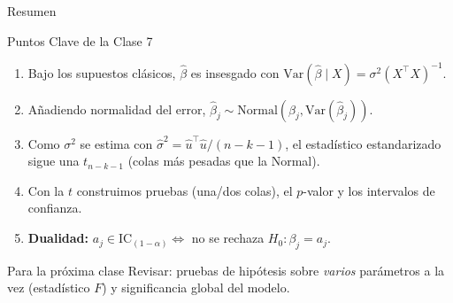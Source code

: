 \documentclass{beamer}
\begin{document}
\begin{frame}{Resumen}

\begin{block}{Puntos Clave de la Clase 7}
\begin{enumerate}
    \item Bajo los supuestos clásicos, $\hat{\beta}$ es insesgado con $\text{Var}(\hat{\beta}\mid X)=\sigma^2(X^\top X)^{-1}$.
    \item Añadiendo normalidad del error, $\hat{\beta}_j\sim\text{Normal}(\beta_j,\text{Var}(\hat{\beta}_j))$.
    \item Como $\sigma^2$ se estima con $\hat{\sigma}^2=\hat{u}^\top\hat{u}/(n-k-1)$, el estadístico estandarizado sigue una $t_{n-k-1}$ (colas más pesadas que la Normal).
    \item Con la $t$ construimos pruebas (una/dos colas), el $p$-valor y los intervalos de confianza.
    \item \textbf{Dualidad:} $a_j\in\text{IC}_{(1-\alpha)} \iff$ no se rechaza $H_0:\beta_j=a_j$.
\end{enumerate}
\end{block}

\begin{alertblock}{Para la próxima clase}
Revisar: pruebas de hipótesis sobre \emph{varios} parámetros a la vez (estadístico $F$) y significancia global del modelo.
\end{alertblock}

\end{frame}
\end{document}
